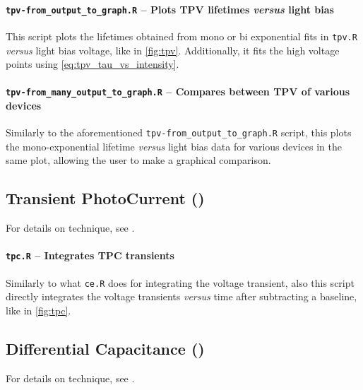 		\paragraph{\texttt{tpv-\-from\_output\_to\_graph.R} -- Plots TPV lifetimes \textsl{versus} light bias}
		This script plots the lifetimes obtained from mono or bi exponential fits in \texttt{tpv.R} \textsl{versus} light bias voltage, like in \cref{fig:tpv}.
		Additionally, it fits the high voltage points using \cref{eq:tpv_tau_vs_intensity}.

		\paragraph{\texttt{tpv-\-from\_many\_output\_to\_graph.R} -- Compares between TPV of various devices}
		Similarly to the aforementioned \texttt{tpv-\-from\_output\_to\_graph.R} script, this plots the mono\hyp{}exponential lifetime \textsl{versus} light bias data for various devices in the same plot, allowing the user to make a graphical comparison.
	\subsection{Transient PhotoCurrent ()}\label{r_tpc}
		For details on  technique, see .

		\paragraph{\texttt{tpc.R} -- Integrates TPC transients}
		Similarly to what \texttt{ce.R} does for integrating the  voltage transient, also this script directly integrates the voltage transients \textsl{versus} time after subtracting a baseline, like in \cref{fig:tpc}.

	\subsection{Differential Capacitance ()}\label{r_dc}
		For details on  technique, see .

